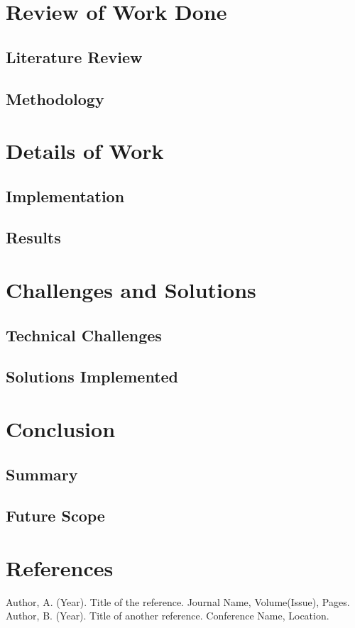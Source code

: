 \documentclass[a4paper,11pt,oneside]{report}
\numberwithin{equation}{section}
\begin{document}
\chapter{Review of Work Done}
\section{Literature Review}
\lipsum[8]
\section{Methodology}
\lipsum[9]

\chapter{Details of Work}
\section{Implementation}
\lipsum[10]
\section{Results}
\lipsum[11]

\chapter{Challenges and Solutions}
\section{Technical Challenges}
\lipsum[12]
\section{Solutions Implemented}
\lipsum[13]

\chapter{Conclusion}
\section{Summary}
\lipsum[14]
\section{Future Scope}
\lipsum[15]

\chapter*{References}
\begin{thebibliography}{99}
 Author, A. (Year). Title of the reference. Journal Name, Volume(Issue), Pages.
 Author, B. (Year). Title of another reference. Conference Name, Location.
\end{thebibliography}
\end{document}
